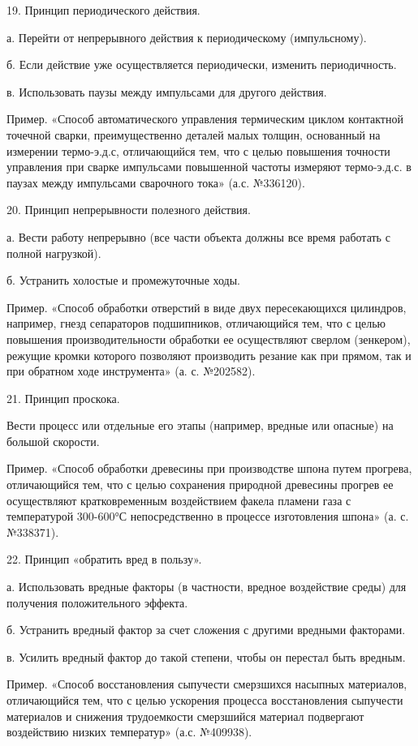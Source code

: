 19. Принцип периодического действия.

а. Перейти от непрерывного действия к периодическому (импульсному).

б.   Если   действие   уже   осуществляется   периодически,   изменить
периодичность.

в. Использовать паузы между импульсами для другого действия.

Пример.   «Способ   автоматического  управления   термическим   циклом
контактной  точечной  сварки,  преимущественно деталей  малых  толщин,
основанный  на измерении  термо-э.д.с, отличающийся  тем, что  с целью
повышения точности управления при сварке импульсами повышенной частоты
измеряют термо-э.д.с. в паузах между импульсами сварочного тока» (а.с.
№336120).

20. Принцип непрерывности полезного действия.

а.  Вести  работу  непрерывно  (все части  объекта  должны  все  время
работать с полной нагрузкой).

б. Устранить холостые и промежуточные ходы.

Пример.  «Способ  обработки  отверстий   в  виде  двух  пересекающихся
цилиндров, например, гнезд  сепараторов подшипников, отличающийся тем,
что  с целью  повышения производительности  обработки ее  осуществляют
сверлом  (зенкером),  режущие  кромки которого  позволяют  производить
резание как  при прямом, так и  при обратном ходе инструмента»  (а. с.
№202582).

21. Принцип проскока.

Вести процесс или отдельные его  этапы (например, вредные или опасные)
на большой скорости.

Пример.  «Способ  обработки  древесины при  производстве  шпона  путем
прогрева, отличающийся тем, что с целью сохранения природной древесины
прогрев  ее осуществляют  кратковременным воздействием  факела пламени
газа с температурой 300-600°С  непосредственно в процессе изготовления
шпона» (а. с. №338371).

22. Принцип «обратить вред в пользу».

а.  Использовать вредные  факторы  (в  частности, вредное  воздействие
среды) для получения положительного эффекта.

б.  Устранить  вредный фактор  за  счет  сложения с  другими  вредными
факторами.

в. Усилить  вредный фактор  до такой степени,  чтобы он  перестал быть
вредным.

Пример.   «Способ   восстановления   сыпучести   смерзшихся   насыпных
материалов,  отличающийся   тем,  что   с  целью   ускорения  процесса
восстановления сыпучести материалов и снижения трудоемкости смерзшийся
материал подвергают воздействию низких температур» (а.с. №409938).


